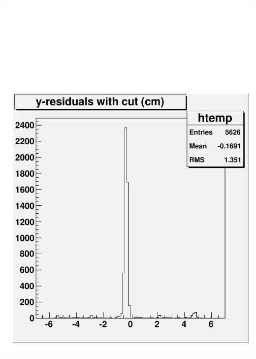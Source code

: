 \documentclass[compress]{beamer}
\begin{document}
\begin{frame}
\begin{columns}
\includegraphics[width=\linewidth]{selectioneffect_resid_withcut.pdf}

\end{columns}
\end{frame}
\end{document}
